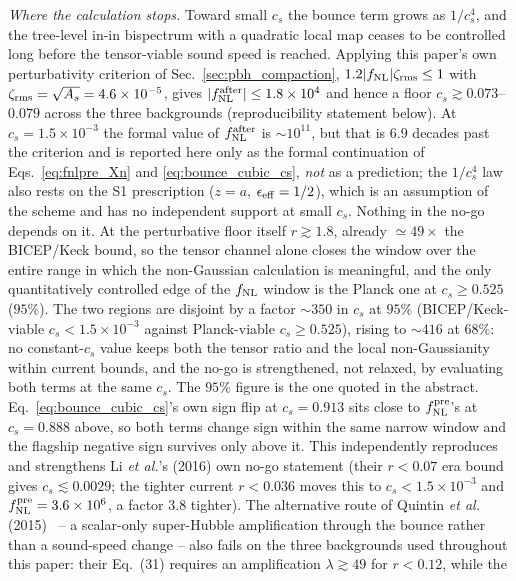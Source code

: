 \documentclass[aps,prd,twocolumn,superscriptaddress,nofootinbib,longbibliography]{revtex4-2}
\newcommand{\fnl}{f_{\rm NL}}
\begin{document}
\emph{Where the calculation stops.} Toward small $c_s$ the bounce term
grows as $1/c_s^4$, and the tree-level in-in bispectrum with a quadratic
local map ceases to be controlled long before the tensor-viable sound
speed is reached. Applying this paper's own perturbativity criterion of
Sec.~\ref{sec:pbh_compaction}, $1.2|\fnl|\zeta_{\rm rms}\le1$ with
$\zeta_{\rm rms}=\sqrt{A_s}=4.6\times10^{-5}$, gives
$|\fnl^{\rm after}|\le1.8\times10^{4}$ and hence a floor
$c_s\gtrsim0.073$--$0.079$ across the three backgrounds
(reproducibility statement below). At
$c_s=1.5\times10^{-3}$ the formal value of $\fnl^{\rm after}$ is
$\sim10^{11}$, but that is $6.9$ decades past the criterion and is
reported here only as the formal continuation of
Eqs.~\eqref{eq:fnlpre_Xn} and \eqref{eq:bounce_cubic_cs}, \emph{not} as a
prediction; the $1/c_s^4$ law also rests on the S1 prescription
($z=a$, $\epsilon_{\rm eff}=1/2$), which is an assumption of the scheme
and has no independent support at small $c_s$. Nothing in the no-go
depends on it. At the perturbative floor itself $r\gtrsim1.8$, already
$\simeq49\times$ the BICEP/Keck bound, so the tensor channel alone closes
the window over the entire range in which the non-Gaussian calculation
is meaningful, and the only quantitatively controlled edge of the
$\fnl$ window is the Planck one at $c_s\ge0.525$ ($95\%$). The two regions are disjoint by a
factor $\sim350$ in $c_s$ at $95\%$ (BICEP/Keck-viable
$c_s<1.5\times10^{-3}$ against Planck-viable $c_s\ge0.525$), rising to
$\sim416$ at $68\%$: no constant-$c_s$
value keeps both the tensor ratio and the local non-Gaussianity within
current bounds, and the no-go is strengthened, not relaxed, by
evaluating both terms at the same $c_s$. The $95\%$ figure is the one
quoted in the abstract. Eq.~\eqref{eq:bounce_cubic_cs}'s
own sign flip at $c_s=0.913$ sits close to $\fnl^{\rm pre}$'s at
$c_s=0.888$ above, so both terms change sign
within the same narrow window and the flagship negative sign survives
only above it. This independently reproduces and strengthens Li
\textit{et al.}'s (2016) own no-go statement (their $r<0.07$ era bound
gives $c_s\lesssim0.0029$; the tighter current $r<0.036$ moves this to
$c_s<1.5\times10^{-3}$ and $\fnl^{\rm pre}=3.6\times10^{6}$, a factor
$3.8$ tighter). The alternative route of Quintin \textit{et al.}
(2015)~\cite{Quintin2015} -- a scalar-only super-Hubble amplification
through the bounce rather than a sound-speed change -- also fails on
the three backgrounds used throughout this paper: their Eq.~(31)
requires an amplification $\lambda\gtrsim49$ for $r<0.12$, while the
\end{document}
